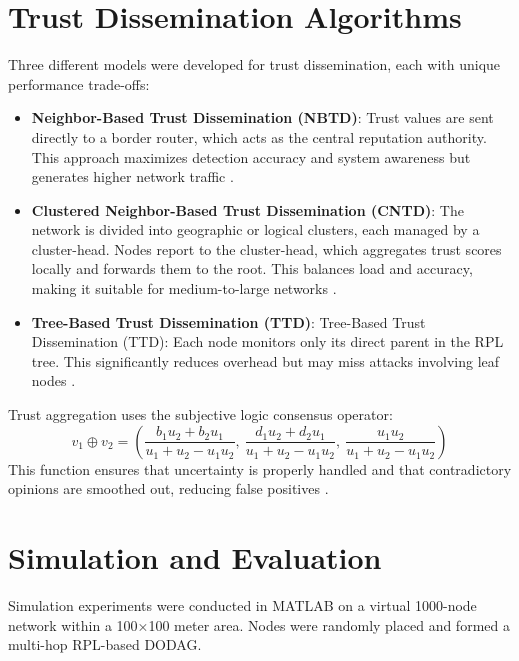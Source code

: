 \documentclass[final,5p,times,twocolumn]{elsarticle}
\begin{document}
\section{Trust Dissemination Algorithms}
Three different models were developed for trust dissemination, each with unique performance trade-offs:
\begin{itemize}
  \item {\textbf{Neighbor-Based Trust Dissemination (NBTD)}}:
  {\normalsize Trust values are sent directly to a border router, which acts as the central reputation authority. This approach maximizes detection accuracy and system awareness but generates higher network traffic \cite{Khan2017}.}
  \item {\textbf{Clustered Neighbor-Based Trust Dissemination (CNTD)}}:
  {\normalsize The network is divided into geographic or logical clusters, each managed by a cluster-head. Nodes report to the cluster-head, which aggregates trust scores locally and forwards them to the root. This balances load and accuracy, making it suitable for medium-to-large networks \cite{Medjek2017}.}
  \item {\textbf{Tree-Based Trust Dissemination (TTD)}}:
  {\normalsize Tree-Based Trust Dissemination (TTD): Each node monitors only its direct parent in the RPL tree. This significantly reduces overhead but may miss attacks involving leaf nodes \cite{Ioulianou2022}.}
\end{itemize}

Trust aggregation uses the subjective logic consensus operator:
\begin{equation}
v_1 \oplus v_2 = 
\left(
\frac{b_1 u_2 + b_2 u_1}{u_1 + u_2 - u_1 u_2},\ 
\frac{d_1 u_2 + d_2 u_1}{u_1 + u_2 - u_1 u_2},\ 
\frac{u_1 u_2}{u_1 + u_2 - u_1 u_2}
\right)
\end{equation}
This function ensures that uncertainty is properly handled and that contradictory opinions are smoothed out, reducing false positives \cite{Ioulianou2022}.

\section{Simulation and Evaluation}
Simulation experiments were conducted in MATLAB on a virtual 1000-node network within a 100×100 meter area. Nodes were randomly placed and formed a multi-hop RPL-based DODAG.
\end{document}
